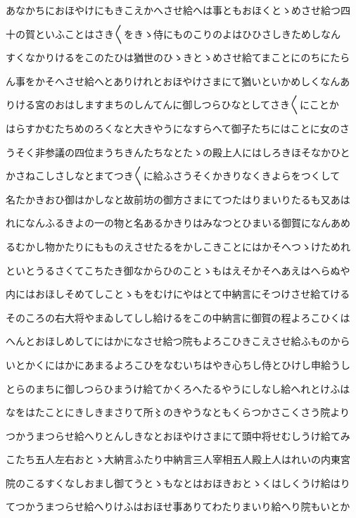 \documentclass[a4paper,11pt,landscape]{ltjtarticle}
\begin{document}
あなかちにおほやけにもきこえかへさせ給へは事ともおほくとゝめさせ給つ四
\par\medskip
十の賀といふことはさき〱をきゝ侍にものこりのよはひひさしきためしなん
\par\medskip
すくなかりけるをこのたひは猶世のひゝきとゝめさせ給てまことにのちにたら
\par\medskip
ん事をかそへさせ給へとありけれとおほやけさまにて猶いといかめしくなんあ
\par\medskip
りける宮のおはしますまちのしんてんに御しつらひなとしてさき〱にことか
\par\medskip
はらすかむたちめのろくなと大きやうになすらへて御子たちにはことに女のさ
\par\medskip
うそく非参議の四位まうちきんたちなとたゝの殿上人にはしろきほそなかひと
\par\medskip
かさねこしさしなとまてつき〱に給ふさうそくかきりなくきよらをつくして
\par\medskip
名たかきおひ御はかしなと故前坊の御方さまにてつたはりまいりたるも又あは
\par\medskip
れになんふるきよの一の物と名あるかきりはみなつとひまいる御賀になんあめ
\par\medskip
るむかし物かたりにもものえさせたるをかしこきことにはかそへつゝけためれ
\par\medskip
といとうるさくてこちたき御なからひのことゝもはえそかそへあえはへらぬや
\par\medskip
内にはおほしそめてしことゝもをむけにやはとて中納言にそつけさせ給てける
\par\medskip
そのころの右大将やまゐしてしし給けるをこの中納言に御賀の程よろこひくは
\par\medskip
へんとおほしめしてにはかになさせ給つ院もよろこひきこえさせ給ふものから
\par\medskip
いとかくにはかにあまるよろこひをなむいちはやき心ちし侍とひけし申給うし
\par\medskip
とらのまちに御しつらひまうけ給てかくろへたるやうにしなし給へれとけふは
\par\medskip
なをはたことにきしきまさりて所〻のきやうなともくらつかさこくさう院より
\par\medskip
つかうまつらせ給へりとんしきなとおほやけさまにて頭中将せむしうけ給てみ
\par\medskip
こたち五人左右おとゝ大納言ふたり中納言三人宰相五人殿上人はれいの内東宮
\par\medskip
院のこるすくなしおまし御てうとゝもなとはおほきおとゝくはしくうけ給はり
\par\medskip
てつかうまつらせ給へりけふはおほせ事ありてわたりまいり給へり院もいとか
\end{document}
